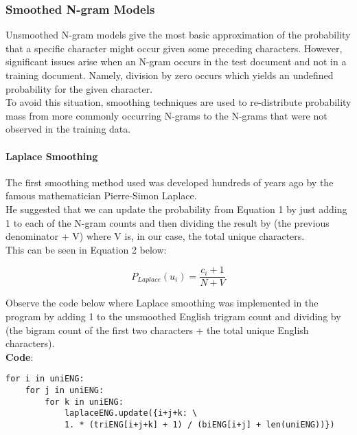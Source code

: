 \documentclass[a4,10pt]{article}
\begin{document}
\subsubsection{Smoothed N-gram Models}

Unsmoothed N-gram models give the most basic approximation of the probability that a specific character might occur given some preceding characters. However, significant issues arise when an N-gram occurs in the test document and not in a training document. Namely, division by zero occurs which yields an undefined probability for the given character. \\

To avoid this situation, smoothing techniques are used to re-distribute probability mass from more commonly occurring N-grams to the N-grams that were not observed in the training data. 

\paragraph{Laplace Smoothing}

The first smoothing method used was developed hundreds of years ago by the famous mathematician Pierre-Simon Laplace. \\

He suggested that we can update the probability from Equation 1 by just adding 1 to each of the N-gram counts and then dividing the result by (the previous denominator + V) where V is, in our case, the total unique characters.   \\

This can be seen in Equation 2 below:

\begin{equation} P_{Laplace}(u_i) = \frac{c_i+1}{N+V} \end{equation}

\newpage

Observe the code below where Laplace smoothing was implemented in the program by adding 1 to the unsmoothed English trigram count and dividing by (the bigram count of the first two characters + the total unique English characters). \\

\textbf{Code}:
\begin{verbatim}
for i in uniENG:
    for j in uniENG:
        for k in uniENG:
            laplaceENG.update({i+j+k: \
            1. * (triENG[i+j+k] + 1) / (biENG[i+j] + len(uniENG))})
\end{verbatim}
\end{document}
